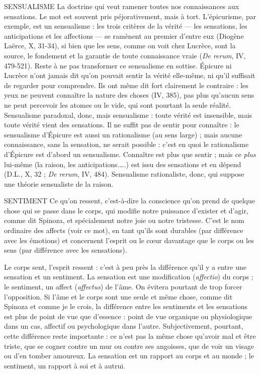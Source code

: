 SENSUALISME La doctrine qui veut ramener toutes nos connaissances aux
sensations. Le mot est souvent pris péjorativement, mais à
tort. L’épicurisme, par exemple, est un sensualisme : les trois critères de la
vérité — les sensations, les anticipations et les affections — se ramènent au premier
d’entre eux (Diogène Laërce, X, 31-34), si bien que les sens, comme on
voit chez Lucrèce, sont la source, le fondement et la garantie de toute connaissance
vraie ({\it De rerum}, IV, 479-521). Reste à ne pas transformer ce sensualisme
en sottise. Épicure ni Lucrèce n’ont jamais dit qu’on pouvait sentir la vérité
elle-même, ni qu’il suffisait de regarder pour comprendre. Ils ont même dit fort
clairement le contraire : les yeux ne peuvent connaître la nature des choses (IV,
385), pas plus qu’aucun sens ne peut percevoir les atomes ou le vide, qui sont
pourtant la seule réalité. Sensualisme paradoxal, donc, mais sensualisme : toute
vérité est insensible, mais toute vérité vient des sensations. Il ne suffit pas de
sentir pour connaître : le sensualisme d’Épicure est aussi un rationalisme (au
sens large) ; mais aucune connaissance, sans la sensation, ne serait possible :
c’est en quoi le rationalisme d’Épicure est d’abord un sensualisme. Connaître
est plus que sentir ; mais ce {\it plus} lui-même (la raison, les anticipations.….) est
issu des sensations et en dépend (D.L., X, 32 ; {\it De rerum}, IV, 484). Sensualisme
rationaliste, donc, qui suppose une théorie sensualiste de la raison.

SENTIMENT Ce qu’on ressent, c’est-à-dire la conscience qu’on prend de
quelque chose qui se passe dans le corps, qui modifie notre
puissance d’exister et d’agir, comme dit Spinoza, et spécialement notre joie ou
notre tristesse. C’est le nom ordinaire des affects (voir ce mot), en tant qu'ils
sont durables (par différence avec les émotions) et concernent l'esprit ou le
cœur davantage que le corps ou les sens (par différence avec les sensations).

Le corps sent, l'esprit ressent : c’est à peu près la différence qu'il y a entre
une sensation et un sentiment. La sensation est une modification ({\it affectio}) du
corps ; le sentiment, un affect ({\it affectus}) de l'âme. On évitera pourtant de trop
forcer l’opposition. Si l’âme et le corps sont une seule et même chose, comme
dit Spinoza et comme je le crois, la différence entre les sentiments et les sensations
est plus de point de vue que d’essence : point de vue organique ou physiologique
dans un cas, affectif ou psychologique dans l’autre. Subjectivement,
pourtant, cette différence reste importante : ce n’est pas la même chose qu'avoir
mal et être triste, que se cogner contre un mur ou contre ses angoisses, que de
voir un visage ou d’en tomber amoureux. La sensation est un rapport au corps
et au monde ; le sentiment, un rapport à soi et à autrui.

